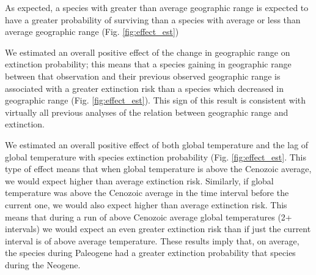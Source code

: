 \documentclass[12pt,letterpaper]{article}
\begin{document}
As expected, a species with greater than average geographic range is expected to have a greater probability of surviving than a species with average or less than average geographic range (Fig. \ref{fig:effect_est})

We estimated an overall positive effect of the change in geographic range on extinction probability; this means that a species gaining in geographic range between that observation and their previous observed geographic range is associated with a greater extinction risk than a species which decreased in geographic range (Fig. \ref{fig:effect_est}). This sign of this result is consistent with virtually all previous analyses of the relation between geographic range and extinction.

We estimated an overall positive effect of both global temperature and the lag of global temperature with species extinction probability (Fig. \ref{fig:effect_est}. This type of effect means that when global temperature is above the Cenozoic average, we would expect higher than average extinction risk. Similarly, if global temperature was above the Cenozoic average in the time interval before the current one, we would also expect higher than average extinction risk. This means that during a run of above Cenozoic average global temperatures (2+ intervals) we would expect an even greater extinction risk than if just the current interval is of above average temperature. These results imply that, on average, the species during Paleogene had a greater extinction probability that species during the Neogene.
\end{document}
